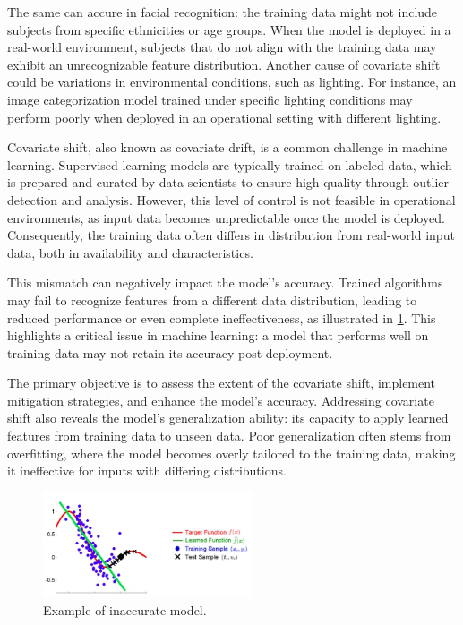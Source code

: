 The same can accure in facial recognition: the training data might not include subjects from specific ethnicities or age groups. When the model is deployed in a real-world environment, subjects that do not align with the training data may exhibit an unrecognizable feature distribution. Another cause of covariate shift could be variations in environmental conditions, such as lighting. For instance, an image categorization model trained under specific lighting conditions may perform poorly when deployed in an operational setting with different lighting.
	
Covariate shift, also known as covariate drift, is a common challenge in machine learning. Supervised learning models are typically trained on labeled data, which is prepared and curated by data scientists to ensure high quality through outlier detection and analysis. However, this level of control is not feasible in operational environments, as input data becomes unpredictable once the model is deployed. Consequently, the training data often differs in distribution from real-world input data, both in availability and characteristics.

This mismatch can negatively impact the model's accuracy. Trained algorithms may fail to recognize features from a different data distribution, leading to reduced performance or even complete ineffectiveness, as illustrated in \cref{fig:inaccurate-model}. This highlights a critical issue in machine learning: a model that performs well on training data may not retain its accuracy post-deployment.

The primary objective is to assess the extent of the covariate shift, implement mitigation strategies, and enhance the model's accuracy. Addressing covariate shift also reveals the model's generalization ability: its capacity to apply learned features from training data to unseen data. Poor generalization often stems from overfitting, where the model becomes overly tailored to the training data, making it ineffective for inputs with differing distributions.

\begin{figure}[H]
	\centering
	\includegraphics[width=0.55\textwidth]{assets/covariate_shift.png} 
	\caption{Example of inaccurate model.}
	\label{fig:inaccurate-model}
\end{figure}